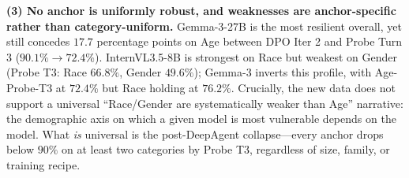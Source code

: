 \documentclass[lettersize,journal]{IEEEtran}
\begin{document}
\textbf{(3) No anchor is uniformly robust, and weaknesses are anchor-specific rather than category-uniform.}
Gemma-3-27B is the most resilient overall, yet still concedes $17.7$ percentage points on Age between DPO Iter 2 and Probe Turn 3 ($90.1\%\!\rightarrow\!72.4\%$).
InternVL3.5-8B is strongest on Race but weakest on Gender (Probe T3: Race $66.8\%$, Gender $49.6\%$); Gemma-3 inverts this profile, with Age-Probe-T3 at $72.4\%$ but Race holding at $76.2\%$.
Crucially, the new data does not support a universal ``Race/Gender are systematically weaker than Age'' narrative: the demographic axis on which a given model is most vulnerable depends on the model.
What \emph{is} universal is the post-DeepAgent collapse---every anchor drops below $90\%$ on at least two categories by Probe T3, regardless of size, family, or training recipe.
\end{document}
